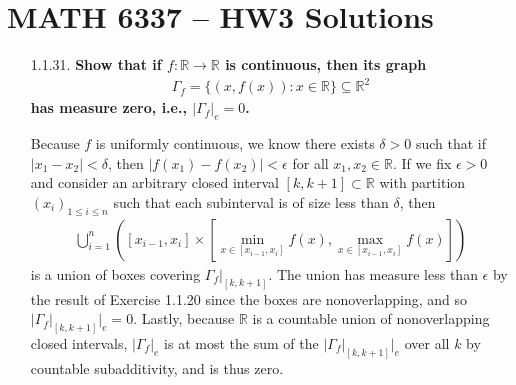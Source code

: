 \documentclass[a4paper,12pt]{article}
\begin{document}
\section*{MATH 6337 -- HW3 Solutions}
\begin{enumerate}
    \item[1.1.31.]
        \boldmath\textbf{Show that if $f : \mathbb{R} \to \mathbb{R}$ is continuous, then its graph
        \begin{align*}
            \Gamma_f = \{ (x, f(x)) : x \in \mathbb{R} \} \subseteq \mathbb{R}^2
        \end{align*}
        has measure zero, i.e., $|\Gamma_f|_e = 0$.
        }\unboldmath \par
        Because $f$ is uniformly continuous, we know there exists $\delta > 0$ such that if $|x_1 - x_2| < \delta$, then $|f(x_1) - f(x_2)| < \epsilon$ for all $x_1, x_2 \in \mathbb{R}$. If we fix $\epsilon > 0$ and consider an arbitrary closed interval $[k, k + 1] \subset \mathbb{R}$ with partition $(x_i)_{1 \leq i \leq n}$ such that each subinterval is of size less than $\delta$, then
        \begin{align*}
            \bigcup_{i = 1}^n \left( [x_{i - 1}, x_i] \times [\min_{x \in [x_{i - 1}, x_i]} f(x), \max_{x \in [x_{i - 1}, x_i]} f(x)] \right)
        \end{align*}
        is a union of boxes covering $\Gamma_f|_{[k, k + 1]}$. The union has measure less than $\epsilon$ by the result of Exercise 1.1.20 since the boxes are nonoverlapping, and so $|\Gamma_f|_{[k, k + 1]}|_e = 0$. Lastly, because $\mathbb{R}$ is a countable union of nonoverlapping closed intervals, $|\Gamma_f|_e$ is at most the sum of the $|\Gamma_f|_{[k, k + 1]}|_e$ over all $k$ by countable subadditivity, and is thus zero.


\end{enumerate}
\end{document}
